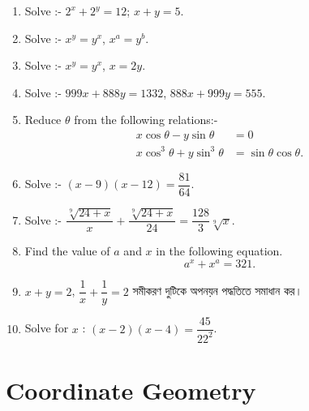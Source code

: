 \documentclass[11pt, a4paper]{article}
\begin{document}
\begin{enumerate}

	\item Solve :- $ 2^x + 2^y = 12  $; $ x+y = 5 $.
	\item Solve :- $ x^y = y^x $, $ x^a = y^b $.
	
	\item Solve :- $ x^y = y^x $, $ x = 2y $.
	
	\item Solve :- $ 999x + 888y = 1332 $, $ 888x + 999y = 555 $.

	\item Reduce $\theta$ from the following relations:-
	\begin{align*}
	x\cos \theta - y \sin \theta &= 0 \\
	x\cos^3 \theta + y \sin^3 \theta &= \sin \theta \cos \theta.
	\end{align*}
	
	\item Solve :- $\left( x - 9 \right) \left( x - 12 \right) = \dfrac{81}{64}$.
	
	\item Solve :- $\dfrac{\sqrt[9]{24+x}}{x} + \dfrac{\sqrt[9]{24+x}}{24} = \dfrac{128}{3} \sqrt[9]{x}$.
	
	\item Find the value of $a$ and $x$ in the following equation. $$a^x + x^a = 321.$$
	
	\item $x + y = 2$, $ \dfrac{1}{x} + \dfrac{1}{y} = 2$ \textbengali{সমীকরণ দুটিকে অপনয়ন পদ্ধতিতে সমাধান কর।}
	
	\item Solve for $x$ : $(x-2)(x-4) = \dfrac{45}{22^2}$.

\end{enumerate}


\section{Coordinate Geometry}
\end{document}

